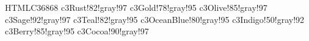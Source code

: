\definecolor{c3CatCoral} {HTML}{C36868}%
   {c3Rust!82!gray!97}%
   {c3Gold!78!gray!95}%
  {c3Olive!85!gray!97}%
   {c3Sage!92!gray!97}%
   {c3Teal!82!gray!95}%
   {c3OceanBlue!80!gray!95}%
 {c3Indigo!50!gray!92}%
%
  {c3Berry!85!gray!95}%
  {c3Cocoa!90!gray!97}%
\endinput